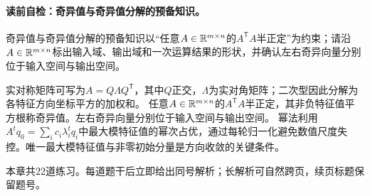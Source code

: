 \paragraph{读前自检：奇异值与奇异值分解的预备知识。}奇异值与奇异值分解的预备知识以“任意$A\in\mathbb{R}^{m\times n}$的$A^{\mathsf T}A$半正定”为约束；请沿$A\in\mathbb{R}^{m\times n}$标出输入域、输出域和一次运算结果的形状，并确认左右奇异向量分别位于输入空间与输出空间。\par

实对称矩阵可写为$A=Q\Lambda Q^{\mathsf T}$，其中$Q$正交，$\Lambda$为实对角矩阵；二次型因此分解为各特征方向坐标平方的加权和。
任意$A\in\mathbb{R}^{m\times n}$的$A^{\mathsf T}A$半正定，其非负特征值平方根称奇异值。左右奇异向量分别位于输入空间与输出空间。
幂法利用$A^tq_0=\sum_i c_i\lambda_i^tq_i$中最大模特征值的幂次占优，通过每轮归一化避免数值尺度失控。唯一最大模特征值与非零初始分量是方向收敛的关键条件。


\begin{chapterexercisebox}
\label{schema:V1-C02:CH-34}
\label{schema:V1-C02:CH-35}
本章共22道练习。每道题干后立即给出同号解析；长解析可自然跨页，续页标题保留题号。
\end{chapterexercisebox}

